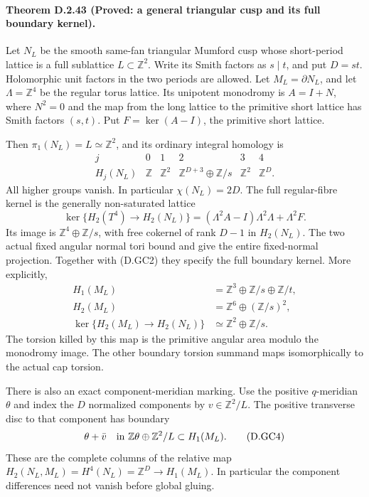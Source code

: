\paragraph{Theorem D.2.43 (Proved: a general triangular cusp and its full boundary kernel).}
Let $N_L$ be the smooth same-fan triangular Mumford cusp
whose short-period lattice is a full sublattice
$L\subset\mathbb Z^2$. Write its Smith factors as
$s\mid t$, and put $D=st$. Holomorphic unit factors
in the two periods are allowed. Let $M_L=\partial N_L$,
and let $\Lambda=\mathbb Z^4$ be the regular torus
lattice. Its unipotent monodromy is $A=I+N$,
where $N^2=0$ and the map from the long lattice to
the primitive short lattice has Smith factors $(s,t)$.
Put $F=\ker(A-I)$, the primitive short lattice.

Then $\pi_1(N_L)=L\simeq\mathbb Z^2$, and its ordinary
integral homology is
\[
 \begin{array}{c|ccccc}
 j&0&1&2&3&4\\ \hline
 H_j(N_L)&\mathbb Z&\mathbb Z^2&
       \mathbb Z^{D+3}\oplus\mathbb Z/s&
       \mathbb Z^2&\mathbb Z^D .
 \end{array}                                             \tag{D.GC1}
\]
All higher groups vanish. In particular $\chi(N_L)=2D$.
The full regular-fibre kernel is the generally
non-saturated lattice
\[
 \ker\{H_2(T^4)\to H_2(N_L)\}
       =(\Lambda^2A-I)\Lambda^2\Lambda+\Lambda^2F .
                                                        \tag{D.GC2}
\]
Its image is $\mathbb Z^4\oplus\mathbb Z/s$, with
free cokernel of rank $D-1$ in $H_2(N_L)$.
The two actual fixed angular normal tori bound
and give the entire fixed-normal projection.
Together with (D.GC2) they specify the full
boundary kernel. More explicitly,
\[
 \begin{split}
 H_1(M_L)&=\mathbb Z^3\oplus\mathbb Z/s\oplus\mathbb Z/t,\\
 H_2(M_L)&=\mathbb Z^6\oplus(\mathbb Z/s)^2,\\
 \ker\{H_2(M_L)\to H_2(N_L)\}
             &\simeq\mathbb Z^2\oplus\mathbb Z/s .
 \end{split}                                             \tag{D.GC3}
\]
The torsion killed by this map is the primitive
angular area modulo the monodromy image. The other
boundary torsion summand maps isomorphically to
the actual cap torsion.

There is also an exact component-meridian marking.
Use the positive $q$-meridian $\theta$ and index
the $D$ normalized components by $v\in\mathbb Z^2/L$.
The positive transverse disc to that component has
boundary
\[
                     \theta+\bar v
           \quad\hbox{in }\mathbb Z\theta\oplus\mathbb Z^2/L
                     \subset H_1(M_L).                  \tag{D.GC4}
\]
These are the complete columns of the relative
map $H_2(N_L,M_L)=H^4(N_L)=\mathbb Z^D\to H_1(M_L)$.
In particular the component differences need not
vanish before global gluing.

